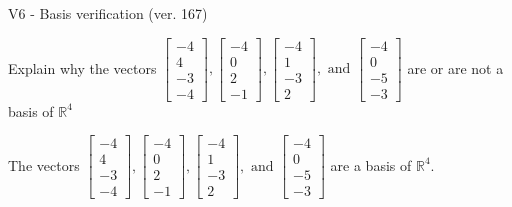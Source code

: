 \begin{exercise}
  \begin{exerciseTitle}V6 - Basis verification (ver. 167)\end{exerciseTitle}
  \begin{exerciseStatement}
    Explain why the vectors \(\left[\begin{array}{r}
-4 \\
4 \\
-3 \\
-4
\end{array}\right] , \left[\begin{array}{r}
-4 \\
0 \\
2 \\
-1
\end{array}\right] , \left[\begin{array}{r}
-4 \\
1 \\
-3 \\
2
\end{array}\right] , \text{ and } \left[\begin{array}{r}
-4 \\
0 \\
-5 \\
-3
\end{array}\right]\) are or are not a basis of \(\mathbb{R}^4\)	


  \end{exerciseStatement}
  \begin{exerciseAnswer}
   The vectors \(\left[\begin{array}{r}
-4 \\
4 \\
-3 \\
-4
\end{array}\right] , \left[\begin{array}{r}
-4 \\
0 \\
2 \\
-1
\end{array}\right] , \left[\begin{array}{r}
-4 \\
1 \\
-3 \\
2
\end{array}\right] , \text{ and } \left[\begin{array}{r}
-4 \\
0 \\
-5 \\
-3
\end{array}\right]\) 
  	 are  a basis of \(\mathbb{R}^4\).
  


  \end{exerciseAnswer}
\end{exercise}